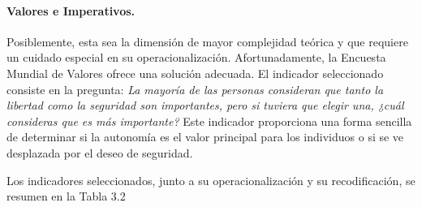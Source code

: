 \documentclass[12pt,twoside]{templates/facsothesis}
\begin{document}
\hypertarget{valores-e-imperativos.}{%
\paragraph*{Valores e Imperativos.}\label{valores-e-imperativos.}}

Posiblemente, esta sea la dimensión de mayor complejidad teórica y que requiere un cuidado especial en su operacionalización. Afortunadamente, la Encuesta Mundial de Valores ofrece una solución adecuada. El indicador seleccionado consiste en la pregunta: \emph{La mayoría de las personas consideran que tanto la libertad como la seguridad son importantes, pero si tuviera que elegir una, ¿cuál consideras que es más importante?} Este indicador proporciona una forma sencilla de determinar si la autonomía es el valor principal para los individuos o si se ve desplazada por el deseo de seguridad.

Los indicadores seleccionados, junto a su operacionalización y su recodificación, se resumen en la Tabla 3.2
\end{document}

